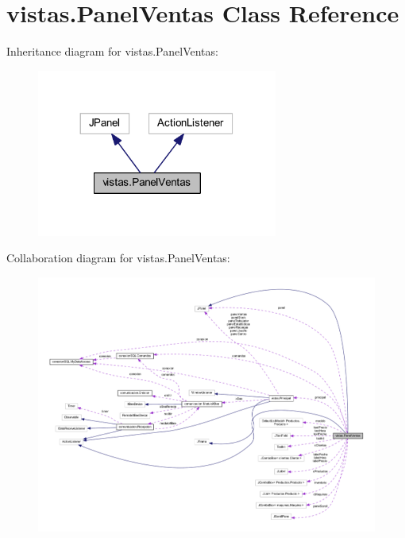 \hypertarget{classvistas_1_1_panel_ventas}{}\section{vistas.\+Panel\+Ventas Class Reference}
\label{classvistas_1_1_panel_ventas}


Inheritance diagram for vistas.\+Panel\+Ventas\+:
\nopagebreak
\begin{figure}[H]
\begin{center}
\leavevmode
\includegraphics[width=224pt]{classvistas_1_1_panel_ventas__inherit__graph}
\end{center}
\end{figure}


Collaboration diagram for vistas.\+Panel\+Ventas\+:
\nopagebreak
\begin{figure}[H]
\begin{center}
\leavevmode
\includegraphics[width=350pt]{classvistas_1_1_panel_ventas__coll__graph}
\end{center}
\end{figure}
